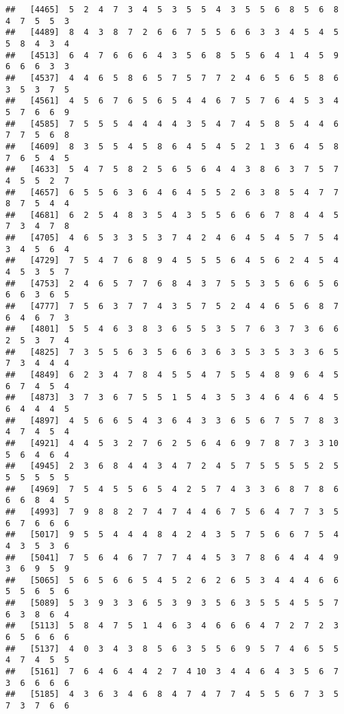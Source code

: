 \documentclass[
]{book}
\begin{document}
\begin{verbatim}
##   [4465]  5  2  4  7  3  4  5  3  5  5  4  3  5  5  6  8  5  6  8  4  7  5  5  3
##   [4489]  8  4  3  8  7  2  6  6  7  5  5  6  6  3  3  4  5  4  5  5  8  4  3  4
##   [4513]  6  4  7  6  6  6  4  3  5  6  8  5  5  6  4  1  4  5  9  6  6  6  3  3
##   [4537]  4  4  6  5  8  6  5  7  5  7  7  2  4  6  5  6  5  8  6  3  5  3  7  5
##   [4561]  4  5  6  7  6  5  6  5  4  4  6  7  5  7  6  4  5  3  4  5  7  6  6  9
##   [4585]  7  5  5  5  4  4  4  4  3  5  4  7  4  5  8  5  4  4  6  7  7  5  6  8
##   [4609]  8  3  5  5  4  5  8  6  4  5  4  5  2  1  3  6  4  5  8  7  6  5  4  5
##   [4633]  5  4  7  5  8  2  5  6  5  6  4  4  3  8  6  3  7  5  7  4  5  5  2  7
##   [4657]  6  5  5  6  3  6  4  6  4  5  5  2  6  3  8  5  4  7  7  8  7  5  4  4
##   [4681]  6  2  5  4  8  3  5  4  3  5  5  6  6  6  7  8  4  4  5  7  3  4  7  8
##   [4705]  4  6  5  3  3  5  3  7  4  2  4  6  4  5  4  5  7  5  4  3  4  5  6  4
##   [4729]  7  5  4  7  6  8  9  4  5  5  5  6  4  5  6  2  4  5  4  4  5  3  5  7
##   [4753]  2  4  6  5  7  7  6  8  4  3  7  5  5  3  5  6  6  5  6  6  6  3  6  5
##   [4777]  7  5  6  3  7  7  4  3  5  7  5  2  4  4  6  5  6  8  7  6  4  6  7  3
##   [4801]  5  5  4  6  3  8  3  6  5  5  3  5  7  6  3  7  3  6  6  2  5  3  7  4
##   [4825]  7  3  5  5  6  3  5  6  6  3  6  3  5  3  5  3  3  6  5  7  3  4  4  4
##   [4849]  6  2  3  4  7  8  4  5  5  4  7  5  5  4  8  9  6  4  5  6  7  4  5  4
##   [4873]  3  7  3  6  7  5  5  1  5  4  3  5  3  4  6  4  6  4  5  6  4  4  4  5
##   [4897]  4  5  6  6  5  4  3  6  4  3  3  6  5  6  7  5  7  8  3  4  7  4  5  4
##   [4921]  4  4  5  3  2  7  6  2  5  6  4  6  9  7  8  7  3  3 10  5  6  4  6  4
##   [4945]  2  3  6  8  4  4  3  4  7  2  4  5  7  5  5  5  5  2  5  5  5  5  5  5
##   [4969]  7  5  4  5  5  6  5  4  2  5  7  4  3  3  6  8  7  8  6  6  6  8  4  5
##   [4993]  7  9  8  8  2  7  4  7  4  4  6  7  5  6  4  7  7  3  5  6  7  6  6  6
##   [5017]  9  5  5  4  4  4  8  4  2  4  3  5  7  5  6  6  7  5  4  4  3  5  3  6
##   [5041]  7  5  6  4  6  7  7  7  4  4  5  3  7  8  6  4  4  4  9  3  6  9  5  9
##   [5065]  5  6  5  6  6  5  4  5  2  6  2  6  5  3  4  4  4  6  6  5  5  6  5  6
##   [5089]  5  3  9  3  3  6  5  3  9  3  5  6  3  5  5  4  5  5  7  6  3  8  6  4
##   [5113]  5  8  4  7  5  1  4  6  3  4  6  6  6  4  7  2  7  2  3  6  5  6  6  6
##   [5137]  4  0  3  4  3  8  5  6  3  5  5  6  9  5  7  4  6  5  5  4  7  4  5  5
##   [5161]  7  6  4  6  4  4  2  7  4 10  3  4  4  6  4  3  5  6  7  3  6  6  6  6
##   [5185]  4  3  6  3  4  6  8  4  7  4  7  7  4  5  5  6  7  3  5  7  3  7  6  6

\end{verbatim}
\end{document}
